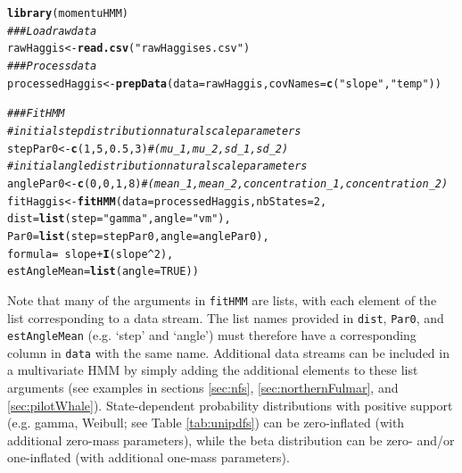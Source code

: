 \documentclass[12pt]{article}\usepackage[]{graphicx}\usepackage[]{xcolor}
\makeatletter
\newcommand{\hlnum}[1]{\textcolor[rgb]{0.686,0.059,0.569}{#1}}%
\newcommand{\hlsng}[1]{\textcolor[rgb]{0.192,0.494,0.8}{#1}}%
\newcommand{\hlcom}[1]{\textcolor[rgb]{0.678,0.584,0.686}{\textit{#1}}}%
\newcommand{\hlopt}[1]{\textcolor[rgb]{0,0,0}{#1}}%
\newcommand{\hldef}[1]{\textcolor[rgb]{0.345,0.345,0.345}{#1}}%
\newcommand{\hlkwb}[1]{\textcolor[rgb]{0.69,0.353,0.396}{#1}}%
\newcommand{\hlkwc}[1]{\textcolor[rgb]{0.333,0.667,0.333}{#1}}%
\newcommand{\hlkwd}[1]{\textcolor[rgb]{0.737,0.353,0.396}{\textbf{#1}}}%
\newenvironment{kframe}{%
 \def\at@end@of@kframe{}%
 \ifinner\ifhmode%
  \def\at@end@of@kframe{\end{minipage}}%
  \begin{minipage}{\columnwidth}%
 \fi\fi%
 \def\FrameCommand##1{\hskip\@totalleftmargin \hskip-\fboxsep
 \colorbox{shadecolor}{##1}\hskip-\fboxsep
     \hskip-\linewidth \hskip-\@totalleftmargin \hskip\columnwidth}%
 \MakeFramed {\advance\hsize-\width
   \@totalleftmargin\z@ \linewidth\hsize
   \@setminipage}}%
 {\par\unskip\endMakeFramed%
 \at@end@of@kframe}
\newenvironment{knitrout}{}{} %
\makeatother
\begin{document}
\begin{knitrout}
\color{fgcolor}\begin{kframe}
\begin{alltt}
\hlkwd{library}\hldef{(momentuHMM)}
\hlcom{### Load raw data}
\hldef{rawHaggis}\hlkwb{<-}\hlkwd{read.csv}\hldef{(}\hlsng{"rawHaggises.csv"}\hldef{)}
\hlcom{### Process data}
\hldef{processedHaggis}\hlkwb{<-}\hlkwd{prepData}\hldef{(}\hlkwc{data}\hldef{=rawHaggis,}\hlkwc{covNames}\hldef{=}\hlkwd{c}\hldef{(}\hlsng{"slope"}\hldef{,}\hlsng{"temp"}\hldef{))}

\hlcom{### Fit HMM	}
\hlcom{# initial step distribution natural scale parameters}
\hldef{stepPar0} \hlkwb{<-} \hlkwd{c}\hldef{(}\hlnum{1}\hldef{,}\hlnum{5}\hldef{,}\hlnum{0.5}\hldef{,}\hlnum{3}\hldef{)} \hlcom{# (mu_1,mu_2,sd_1,sd_2)}
\hlcom{# initial angle distribution natural scale parameters }
\hldef{anglePar0} \hlkwb{<-} \hlkwd{c}\hldef{(}\hlnum{0}\hldef{,}\hlnum{0}\hldef{,}\hlnum{1}\hldef{,}\hlnum{8}\hldef{)} \hlcom{# (mean_1,mean_2,concentration_1,concentration_2)       	}
\hldef{fitHaggis} \hlkwb{<-} \hlkwd{fitHMM}\hldef{(}\hlkwc{data} \hldef{= processedHaggis,} \hlkwc{nbStates} \hldef{=} \hlnum{2}\hldef{,}
                    \hlkwc{dist} \hldef{=} \hlkwd{list}\hldef{(}\hlkwc{step} \hldef{=} \hlsng{"gamma"}\hldef{,} \hlkwc{angle} \hldef{=} \hlsng{"vm"}\hldef{),}
                    \hlkwc{Par0} \hldef{=} \hlkwd{list}\hldef{(}\hlkwc{step} \hldef{= stepPar0,} \hlkwc{angle} \hldef{= anglePar0),}
                    \hlkwc{formula} \hldef{=} \hlopt{~} \hldef{slope} \hlopt{+} \hlkwd{I}\hldef{(slope}\hlopt{^}\hlnum{2}\hldef{),}
                    \hlkwc{estAngleMean} \hldef{=} \hlkwd{list}\hldef{(}\hlkwc{angle}\hldef{=}\hlnum{TRUE}\hldef{))}
\end{alltt}
\end{kframe}
\end{knitrout}
Note that many of the arguments in \verb|fitHMM| are lists, with each element of the list corresponding to a data stream.  The list names provided in \verb|dist|, \verb|Par0|, and \verb|estAngleMean| (e.g. `step' and `angle') must therefore have a corresponding column in \verb|data| with the same name.  Additional data streams can be included in a multivariate HMM by simply adding the additional elements to these list arguments (see examples in sections \ref{sec:nfs}, \ref{sec:northernFulmar}, and \ref{sec:pilotWhale}).  State-dependent probability distributions with positive support (e.g. gamma, Weibull; see Table \ref{tab:unipdfs}) can be zero-inflated (with additional zero-mass parameters), while the beta distribution can be zero- and/or one-inflated (with additional one-mass parameters).
\end{document}
